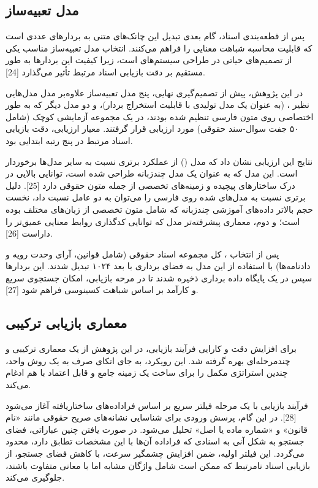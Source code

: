 \documentclass[12pt,a4paper]{report}
\begin{document}
	\subsection{مدل تعبیه‌ساز}
	
	پس از قطعه‌بندی اسناد، گام بعدی تبدیل این چانک‌های متنی به بردارهای عددی است که قابلیت محاسبه شباهت معنایی را فراهم می‌کنند. انتخاب مدل تعبیه‌ساز مناسب یکی از تصمیم‌های حیاتی در طراحی سیستم‌های  است، زیرا کیفیت این بردارها به طور مستقیم بر دقت بازیابی اسناد مرتبط تأثیر می‌گذارد [24].
	
	در این پژوهش، پیش از تصمیم‌گیری نهایی، پنج مدل تعبیه‌ساز علاوه‌بر مدل‌ مدل‌هایی نظیر ،  (به عنوان یک مدل تولیدی با قابلیت استخراج بردار)، و دو مدل دیگر که به طور اختصاصی روی متون فارسی تنظیم شده بودند، در یک مجموعه آزمایشی کوچک (شامل ۵۰ جفت سوال-سند حقوقی) مورد ارزیابی قرار گرفتند. معیار ارزیابی، دقت بازیابی اسناد مرتبط در پنج رتبه ابتدایی بود.
	
	نتایج این ارزیابی نشان داد که مدل  () از عملکرد برتری نسبت به سایر مدل‌ها برخوردار است. این مدل که به عنوان یک مدل چندزبانه طراحی شده است، توانایی بالایی در درک ساختارهای پیچیده و زمینه‌های تخصصی از جمله متون حقوقی دارد [25]. دلیل برتری  نسبت به مدل‌های  شده روی فارسی را می‌توان به دو عامل نسبت داد، نخست حجم بالاتر داده‌های آموزشی چندزبانه که شامل متون تخصصی از زبان‌های مختلف بوده است؛ و دوم، معماری پیشرفته‌تر مدل که توانایی کدگذاری روابط معنایی عمیق‌تر را داراست [26].
	
	پس از انتخاب ، کل مجموعه اسناد حقوقی (شامل قوانین، آرای وحدت رویه و دادنامه‌ها) با استفاده از این مدل به فضای برداری با بعد ۱۰۲۴ تبدیل شدند. این بردارها سپس در یک پایگاه داده برداری  ذخیره شدند تا در مرحه بازیابی، امکان جستجوی سریع و کارآمد بر اساس شباهت کسینوسی  فراهم شود [27].
	
	\subsection{معماری بازیابی ترکیبی}
	
	برای افزایش دقت و کارایی فرآیند بازیابی، در این پژوهش از یک معماری ترکیبی و چندمرحله‌ای بهره گرفته شد. این رویکرد، به جای اتکای صرف به یک روش واحد، چندین استراتژی مکمل را برای ساخت یک زمینه جامع و قابل اعتماد با هم ادغام می‌کند.
	
	فرآیند بازیابی با یک مرحله فیلتر سریع بر اساس فراداده‌های ساختاریافته آغاز می‌شود [28]. در این گام، پرسش ورودی برای شناسایی نشانه‌های صریح حقوقی مانند «نام قانون» و «شماره ماده یا اصل» تحلیل می‌شود. در صورت یافتن چنین عباراتی، فضای جستجو به شکل آنی به اسنادی که فراداده آن‌ها با این مشخصات تطابق دارد، محدود می‌گردد. این فیلتر اولیه، ضمن افزایش چشمگیر سرعت، با کاهش فضای جستجو، از بازیابی اسناد نامرتبط که ممکن است شامل واژگان مشابه اما با معانی متفاوت باشند، جلوگیری می‌کند.
	
\end{document}
